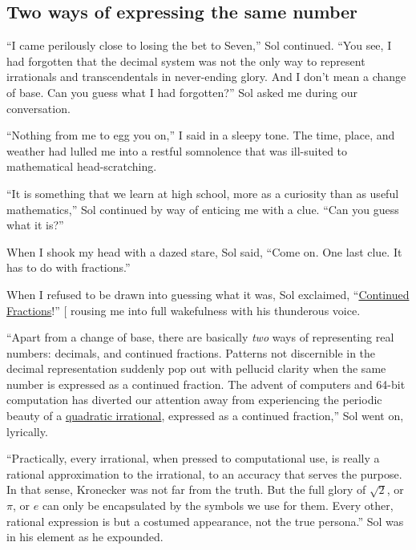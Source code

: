 \documentclass[
  a4paper,
]{article}
\begin{document}
\subsection{Two ways of expressing the same
number}\label{two-ways-of-expressing-the-same-number}

``I came perilously close to losing the bet to Seven,'' Sol continued.
``You see, I had forgotten that the decimal system was not the only way
to represent irrationals and transcendentals in never-ending glory. And
I don't mean a change of base. Can you guess what I had forgotten?'' Sol
asked me during our conversation.

``Nothing from me to egg you on,'' I said in a sleepy tone. The time,
place, and weather had lulled me into a restful somnolence that was
ill-suited to mathematical head-scratching.

``It is something that we learn at high school, more as a curiosity than
as useful mathematics,'' Sol continued by way of enticing me with a
clue. ``Can you guess what it is?''

When I shook my head with a dazed stare, Sol said, ``Come on. One last
clue. It has to do with fractions.''

When I refused to be drawn into guessing what it was, Sol exclaimed,
``\href{https://en.wikipedia.org/wiki/Continued_fraction}{Continued
Fractions}!'' {[}\citeproc{ref-loya2017}{8}{]} rousing me into full
wakefulness with his thunderous voice.

``Apart from a change of base, there are basically \emph{two} ways of
representing real numbers: decimals, and continued fractions. Patterns
not discernible in the decimal representation suddenly pop out with
pellucid clarity when the same number is expressed as a continued
fraction. The advent of computers and 64-bit computation has diverted
our attention away from experiencing the periodic beauty of a
\href{https://en.wikipedia.org/wiki/Quadratic_irrational_number}{quadratic
irrational}, expressed as a continued fraction,'' Sol went on,
lyrically.

``Practically, every irrational, when pressed to computational use, is
really a rational approximation to the irrational, to an accuracy that
serves the purpose. In that sense, Kronecker was not far from the truth.
But the full glory of \(\sqrt{2}\), or \(\pi\), or \(e\) can only be
encapsulated by the symbols we use for them. Every other, rational
expression is but a costumed appearance, not the true persona.'' Sol was
in his element as he expounded.
\end{document}
